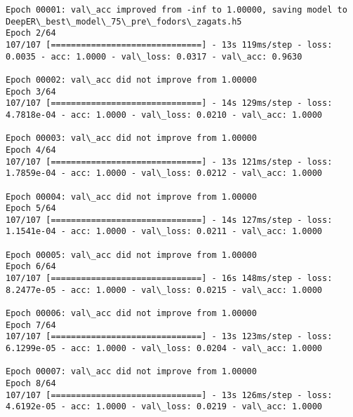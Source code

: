 \documentclass[11pt]{article}
\begin{document}
\begin{Verbatim}[commandchars=\\\{\}]
Epoch 00001: val\_acc improved from -inf to 1.00000, saving model to DeepER\_best\_model\_75\_pre\_fodors\_zagats.h5
Epoch 2/64
107/107 [==============================] - 13s 119ms/step - loss: 0.0035 - acc: 1.0000 - val\_loss: 0.0317 - val\_acc: 0.9630

Epoch 00002: val\_acc did not improve from 1.00000
Epoch 3/64
107/107 [==============================] - 14s 129ms/step - loss: 4.7818e-04 - acc: 1.0000 - val\_loss: 0.0210 - val\_acc: 1.0000

Epoch 00003: val\_acc did not improve from 1.00000
Epoch 4/64
107/107 [==============================] - 13s 121ms/step - loss: 1.7859e-04 - acc: 1.0000 - val\_loss: 0.0212 - val\_acc: 1.0000

Epoch 00004: val\_acc did not improve from 1.00000
Epoch 5/64
107/107 [==============================] - 14s 127ms/step - loss: 1.1541e-04 - acc: 1.0000 - val\_loss: 0.0211 - val\_acc: 1.0000

Epoch 00005: val\_acc did not improve from 1.00000
Epoch 6/64
107/107 [==============================] - 16s 148ms/step - loss: 8.2477e-05 - acc: 1.0000 - val\_loss: 0.0215 - val\_acc: 1.0000

Epoch 00006: val\_acc did not improve from 1.00000
Epoch 7/64
107/107 [==============================] - 13s 123ms/step - loss: 6.1299e-05 - acc: 1.0000 - val\_loss: 0.0204 - val\_acc: 1.0000

Epoch 00007: val\_acc did not improve from 1.00000
Epoch 8/64
107/107 [==============================] - 13s 126ms/step - loss: 4.6192e-05 - acc: 1.0000 - val\_loss: 0.0219 - val\_acc: 1.0000


\end{Verbatim}
\end{document}
